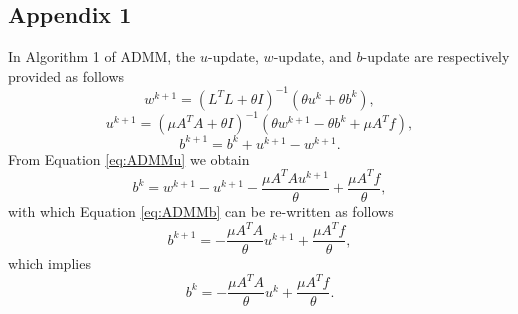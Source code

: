 \documentclass[letterpaper]{article} %
\begin{document}
\subsection*{Appendix 1}
In Algorithm 1 of ADMM, the $u$-update, $w$-update, and $b$-update are respectively provided as follows
\begin{equation} \label{eq:ADMMw}
{w^{k + 1}} = {\left( { {L^T}L + \theta I} \right)}^{ - 1}\left( {\theta {u^k} + \theta {b^k}} \right),
\end{equation}
\begin{equation} \label{eq:ADMMu}
{u^{k + 1}} = {\left( {\mu{A^T}A + \theta I} \right)}^{ - 1}\left( {\theta {w^{k + 1}} - \theta {b^k} + \mu{A^T}f} \right),
\end{equation}
\begin{equation} \label{eq:ADMMb}
	{b^{k + 1}} = {b^k} + {u^{k + 1}} - {w^{k + 1}}.
\end{equation}
From Equation \eqref{eq:ADMMu} we obtain
\begin{equation*}
	{b^k}={w^{k + 1}}-u^{k + 1}- \frac{{\mu{A^T}A  }  u^{k + 1}}{\theta}+ \frac{{\mu{A^T}f}}{\theta },
\end{equation*}
with which Equation \eqref{eq:ADMMb} can be re-written as follows
\begin{equation*} %
	{b^{k + 1}} =  - \frac{{\mu{A^T}A}}{\theta }{u^{k + 1}} + \frac{{\mu{A^T}f}}{\theta },
\end{equation*}
which implies
\begin{equation} \label{eq:ADMMb3}
	{b^{k}} =  - \frac{{\mu{A^T}A}}{\theta }{u^{k}} + \frac{{\mu{A^T}f}}{\theta }.
\end{equation}
\end{document}
